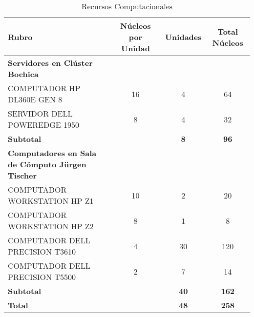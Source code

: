 \begin{spacing}{1.5}
  \begin{table}[h!]
    \centering
    \begin{tabular}{p{5cm}|c|c|c}
      \hline
      \textbf{Rubro}                                          & \textbf{Núcleos por Unidad} & \textbf{Unidades} &
      \textbf{Total Núcleos}                                                                                                   \\ \hline
      \textbf{Servidores en Clúster Bochica}                  &                             &                   &              \\ \hline
      COMPUTADOR HP DL360E GEN 8                              & 16                          & 4                 & 64           \\ \hline
      SERVIDOR DELL POWEREDGE 1950                            & 8                           & 4                 & 32           \\ \hline
      \textbf{Subtotal}                                       &                             & \textbf{8}        & \textbf{96}  \\ \hline
      \textbf{Computadores en Sala de Cómputo Jürgen Tischer} &                             &                   &              \\ \hline
      COMPUTADOR WORKSTATION HP Z1                            & 10                          & 2                 & 20           \\ \hline
      COMPUTADOR WORKSTATION HP Z2                            & 8                           & 1                 & 8            \\ \hline
      COMPUTADOR DELL PRECISION T3610                         & 4                           & 30                & 120          \\ \hline
      COMPUTADOR DELL PRECISION T5500                         & 2                           & 7                 & 14           \\ \hline
      \textbf{Subtotal}                                       &                             & \textbf{40}       & \textbf{162} \\ \hline
      \textbf{Total}                                          & \textbf{ }                  & \textbf{48}       & \textbf{258} \\ \hline
    \end{tabular}
    \caption{Recursos Computacionales}
    \label{table:table1}
  \end{table}


\end{spacing}
